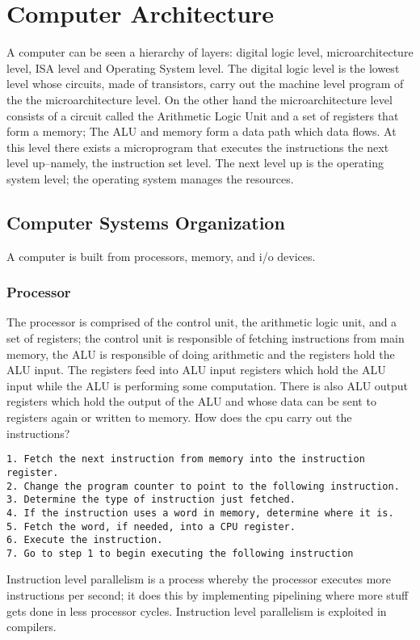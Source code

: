\documentclass[10pt]{article}
\begin{document}
\section{Computer Architecture}
A computer can be seen a hierarchy of layers: digital logic level, microarchitecture level, ISA level and Operating System level. The digital logic level is the lowest level whose circuits, made of transistors, carry out the machine level program of the the microarchitecture level. On the other hand the microarchitecture level consists of a circuit called the Arithmetic Logic Unit and a set of registers that form a memory; The ALU and memory form a data path which data flows. At this level there exists a microprogram that executes the instructions the next level up--namely, the instruction set level. The next level up is the operating system level; the operating system manages the resources.

\subsection{Computer Systems Organization}
A computer is built from processors, memory, and i/o devices.
\subsubsection{Processor}
The processor is comprised of the control unit, the arithmetic logic unit, and a set of registers; the control unit is responsible of fetching instructions from main memory, the ALU
is responsible of doing arithmetic and the registers hold the ALU input. The registers feed into ALU input registers which hold the ALU input while the ALU is performing some computation. There is also ALU output registers which hold the output of the ALU and whose data can be sent to registers again or written to memory. How does the cpu carry out the instructions?

\begin{lstlisting}
1. Fetch the next instruction from memory into the instruction register.
2. Change the program counter to point to the following instruction.
3. Determine the type of instruction just fetched.
4. If the instruction uses a word in memory, determine where it is.
5. Fetch the word, if needed, into a CPU register.
6. Execute the instruction.
7. Go to step 1 to begin executing the following instruction
\end{lstlisting}

Instruction level parallelism is a process whereby the processor executes more instructions per second; it does this by implementing pipelining where more stuff gets done in less processor cycles. Instruction level parallelism is exploited in compilers.
\end{document}
